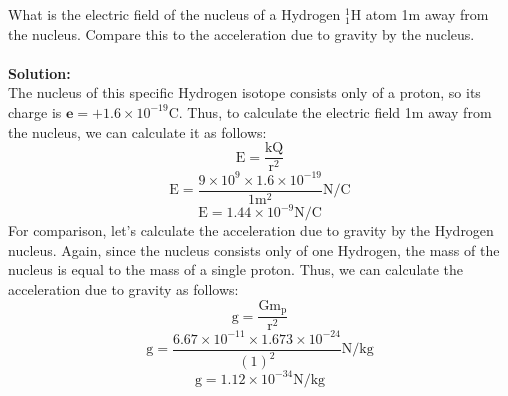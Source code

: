 \documentclass[9pt,addpoints]{exam}
\begin{document}
\begin{questions}
		\question What is the electric field of the nucleus of a Hydrogen $^1_1\text{H}$ atom 1m away from the nucleus. Compare this to the acceleration due to gravity by the nucleus. \\ \\
		\textbf{Solution:} \\
		The nucleus of this specific Hydrogen isotope consists only of a proton, so its charge is $\textbf{e}=+1.6\times10^{-19}\text{C}$. Thus, to calculate the electric field 1m away from the nucleus, we can calculate it as follows:
		$$\text{E}=\dfrac{\text{kQ}}{\text{r}^2}$$
		$$\text{E}=\dfrac{9\times10^9\times1.6\times10^{-19}}{1\text{m}^2}\text{N/C}$$
		$$\text{E}=1.44\times10^{-9}\text{N/C}$$
		For comparison, let's calculate the acceleration due to gravity by the Hydrogen nucleus. Again, since the nucleus consists only of one Hydrogen, the mass of the nucleus is equal to the mass of a single proton. Thus, we can calculate the acceleration due to gravity as follows:
		$$\text{g}=\dfrac{\text{Gm}_\text{p}}{\text{r}^2}$$
		$$\text{g}=\dfrac{6.67\times10^{-11}\times1.673\times10^{-24}}{(1)^2}\text{N/kg}$$
		$$\text{g}=1.12\times10^{-34}\text{N/kg}$$
	\end{questions}		
\end{document}

